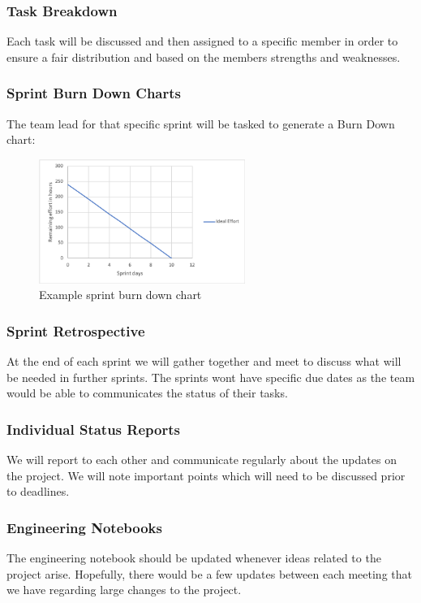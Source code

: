 \subsubsection{Task Breakdown}
Each task will be discussed and then assigned to a specific member in order to ensure a fair distribution and based on the members
strengths and weaknesses.
\subsubsection{Sprint Burn Down Charts}
The team lead for that specific sprint will be tasked to generate a Burn Down chart:

\begin{figure}[h!]
    \centering
    \includegraphics[width=0.6\textwidth]{images/burndown}
    \caption{Example sprint burn down chart}
\end{figure}

\subsubsection{Sprint Retrospective}
At the end of each sprint we will gather together and meet to discuss what will be needed in further sprints. The sprints wont have specific due dates
as the team would be able to communicates the status of their tasks.
\subsubsection{Individual Status Reports}
We will report to each other and communicate regularly about the updates on the project. We will note important points which will need to be discussed prior to deadlines.
\subsubsection{Engineering Notebooks}
The engineering notebook should be updated whenever ideas related to the project arise. Hopefully,
there would be a few updates between each meeting that we have regarding large changes to the project.


